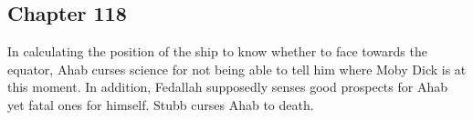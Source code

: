 \subsection{Chapter 118}

In calculating the position of the ship to know whether to face towards the
equator, Ahab curses science for not being able to tell him where Moby Dick is
at this moment. In addition, Fedallah supposedly senses good prospects for Ahab
yet fatal ones for himself. Stubb curses Ahab to death.
